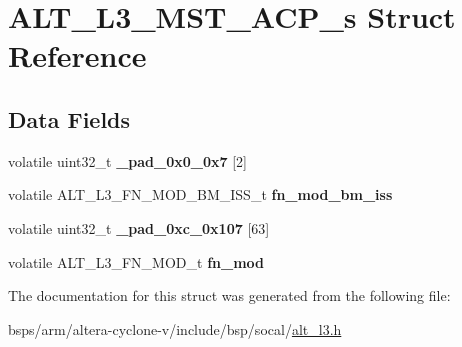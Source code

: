 \hypertarget{structALT__L3__MST__ACP__s}{}\section{A\+L\+T\+\_\+\+L3\+\_\+\+M\+S\+T\+\_\+\+A\+C\+P\+\_\+s Struct Reference}
\label{structALT__L3__MST__ACP__s}
\subsection*{Data Fields}
\begin{DoxyCompactItemize}
\item 
\mbox{\label{structALT__L3__MST__ACP__s_a89c809a983da3deeec3e13cea180e6e2}} 
volatile uint32\+\_\+t {\bfseries \+\_\+pad\+\_\+0x0\+\_\+0x7} \mbox{[}2\mbox{]}
\item 
\mbox{\label{structALT__L3__MST__ACP__s_a3ac7431b7806fd563d7973c3e6a9d8dd}} 
volatile A\+L\+T\+\_\+\+L3\+\_\+\+F\+N\+\_\+\+M\+O\+D\+\_\+\+B\+M\+\_\+\+I\+S\+S\+\_\+t {\bfseries fn\+\_\+mod\+\_\+bm\+\_\+iss}
\item 
\mbox{\label{structALT__L3__MST__ACP__s_abfdd7933dbc4c4cd4172f2e34197d7c0}} 
volatile uint32\+\_\+t {\bfseries \+\_\+pad\+\_\+0xc\+\_\+0x107} \mbox{[}63\mbox{]}
\item 
\mbox{\label{structALT__L3__MST__ACP__s_a6a4ee779e4eeffcec1a0378146d52245}} 
volatile A\+L\+T\+\_\+\+L3\+\_\+\+F\+N\+\_\+\+M\+O\+D\+\_\+t {\bfseries fn\+\_\+mod}
\end{DoxyCompactItemize}


The documentation for this struct was generated from the following file\+:\begin{DoxyCompactItemize}
\item 
bsps/arm/altera-\/cyclone-\/v/include/bsp/socal/\mbox{\hyperlink{alt__l3_8h}{alt\+\_\+l3.\+h}}\end{DoxyCompactItemize}
